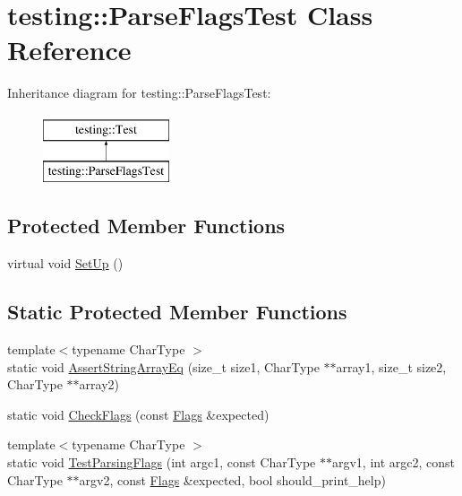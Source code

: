 \hypertarget{classtesting_1_1ParseFlagsTest}{}\section{testing\+::Parse\+Flags\+Test Class Reference}
\label{classtesting_1_1ParseFlagsTest}
Inheritance diagram for testing\+::Parse\+Flags\+Test\+:\begin{figure}[H]
\begin{center}
\leavevmode
\includegraphics[height=2.000000cm]{classtesting_1_1ParseFlagsTest}
\end{center}
\end{figure}
\subsection*{Protected Member Functions}
\begin{DoxyCompactItemize}
\item 
virtual void \mbox{\hyperlink{classtesting_1_1ParseFlagsTest_a72fd683f0bc0c2701d9a183c6b20cb48}{Set\+Up}} ()
\end{DoxyCompactItemize}
\subsection*{Static Protected Member Functions}
\begin{DoxyCompactItemize}
\item 
{\footnotesize template$<$typename Char\+Type $>$ }\\static void \mbox{\hyperlink{classtesting_1_1ParseFlagsTest_a5d93780e65e1aa304334a8d4372c51fc}{Assert\+String\+Array\+Eq}} (size\+\_\+t size1, Char\+Type $\ast$$\ast$array1, size\+\_\+t size2, Char\+Type $\ast$$\ast$array2)
\item 
static void \mbox{\hyperlink{classtesting_1_1ParseFlagsTest_a5919553c35ebe3910fcff51cc0b59fd6}{Check\+Flags}} (const \mbox{\hyperlink{structtesting_1_1Flags}{Flags}} \&expected)
\item 
{\footnotesize template$<$typename Char\+Type $>$ }\\static void \mbox{\hyperlink{classtesting_1_1ParseFlagsTest_ad769e5f5a71939c3a9ad853b415fa9d2}{Test\+Parsing\+Flags}} (int argc1, const Char\+Type $\ast$$\ast$argv1, int argc2, const Char\+Type $\ast$$\ast$argv2, const \mbox{\hyperlink{structtesting_1_1Flags}{Flags}} \&expected, bool should\+\_\+print\+\_\+help)
\end{DoxyCompactItemize}
